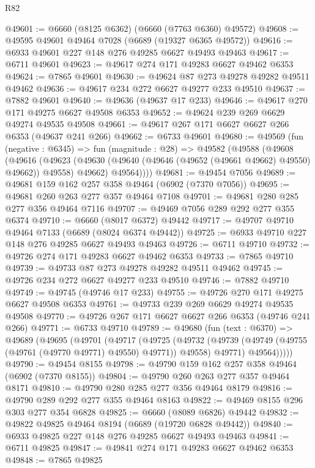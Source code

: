 \begin{lexlean}{R82}
\begin{coremodule}
@49601 := @6660 (@8125 @6362) (@6660 (@7763 @6360) @49572)
@49608 := @49595 @49601 @49464 @7028 (@6689 (@19327 @6365 @49572))
@49616 := @6933 @49601 @227 @148 @276 @49285 @6627 @49493 @49463
@49617 := @6711 @49601
@49623 := @49617 @274 @171 @49283 @6627 @49462 @6353
@49624 := @7865 @49601
@49630 := @49624 @87 @273 @49278 @49282 @49511 @49462
@49636 := @49617 @234 @272 @6627 @49277 @233 @49510
@49637 := @7882 @49601
@49640 := @49636 (@49637 @17 @233)
@49646 := @49617 @270 @171 @49275 @6627 @49508 @6353
@49652 := @49624 @239 @269 @6629 @49274 @49535 @49508
@49661 := @49617 @267 @171 @6627 @6627 @266 @6353 (@49637 @241 @266)
@49662 := @6733 @49601
@49680 := @49569
    (fun (negative : @6345) =>
    fun (magnitude : @28) =>
    @49582
      (@49588
        (@49608
          (@49616
            (@49623 (@49630 (@49640 (@49646 (@49652 (@49661 @49662) @49550) @49662)) @49558) @49662)
            @49564))))
@49681 := @49454 @7056
@49689 := @49681 @159 @162 @257 @358 @49464 (@6902 (@7370 @7056))
@49695 := @49681 @260 @263 @277 @357 @49464 @7108
@49701 := @49681 @280 @285 @277 @356 @49464 @7116
@49707 := @49469 @7056 @289 @292 @277 @355 @6374
@49710 := @6660 (@8017 @6372) @49442
@49717 := @49707 @49710 @49464 @7133 (@6689 (@8024 @6374 @49442))
@49725 := @6933 @49710 @227 @148 @276 @49285 @6627 @49493 @49463
@49726 := @6711 @49710
@49732 := @49726 @274 @171 @49283 @6627 @49462 @6353
@49733 := @7865 @49710
@49739 := @49733 @87 @273 @49278 @49282 @49511 @49462
@49745 := @49726 @234 @272 @6627 @49277 @233 @49510
@49746 := @7882 @49710
@49749 := @49745 (@49746 @17 @233)
@49755 := @49726 @270 @171 @49275 @6627 @49508 @6353
@49761 := @49733 @239 @269 @6629 @49274 @49535 @49508
@49770 := @49726 @267 @171 @6627 @6627 @266 @6353 (@49746 @241 @266)
@49771 := @6733 @49710
@49789 := @49680
    (fun (text : @6370) =>
    @49689
      (@49695
        (@49701
          (@49717
            (@49725
              (@49732
                (@49739 (@49749 (@49755 (@49761 (@49770 @49771) @49550) @49771)) @49558)
                @49771)
              @49564)))))
@49790 := @49454 @8155
@49798 := @49790 @159 @162 @257 @358 @49464 (@6902 (@7370 @8155))
@49804 := @49790 @260 @263 @277 @357 @49464 @8171
@49810 := @49790 @280 @285 @277 @356 @49464 @8179
@49816 := @49790 @289 @292 @277 @355 @49464 @8163
@49822 := @49469 @8155 @296 @303 @277 @354 @6828
@49825 := @6660 (@8089 @6826) @49442
@49832 := @49822 @49825 @49464 @8194 (@6689 (@19720 @6828 @49442))
@49840 := @6933 @49825 @227 @148 @276 @49285 @6627 @49493 @49463
@49841 := @6711 @49825
@49847 := @49841 @274 @171 @49283 @6627 @49462 @6353
@49848 := @7865 @49825

\end{coremodule}
\end{lexlean}
